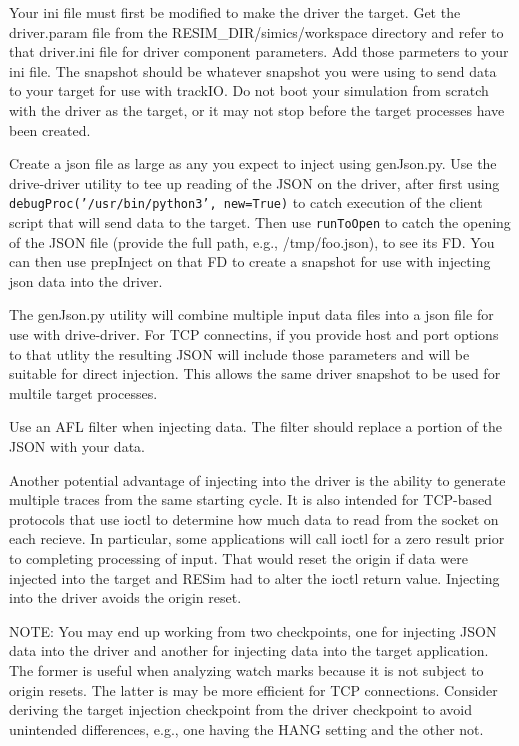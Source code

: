 \documentclass[titlepage]{article}
\begin{document}
Your ini file must first be modified to make the driver the target.  Get the driver.param file from the RESIM\_DIR/simics/workspace directory and
refer to that driver.ini file for driver component parameters.  Add those parmeters to your ini file.   The snapshot should be whatever snapshot you were using to send
data to your target for use with trackIO.
Do not boot your simulation from scratch with the driver as the target, or it may not stop before the target processes have been created.

Create a json file as large as any you expect to inject using genJson.py.
Use the drive-driver utility to tee up reading of the JSON on the driver, after first using {\tt debugProc('/usr/bin/python3', new=True)}
to catch execution of the client script that will send data to the target.  
Then use {\tt runToOpen} to catch the opening of the JSON file (provide the full path, e.g., /tmp/foo.json), to see its FD.  You can then use prepInject on that FD
to create a snapshot for use with injecting json data into the driver.  

The genJson.py utility will combine multiple input data files into a json file for use with drive-driver.  For TCP connectins, if 
you provide host and port options to that utlity the resulting JSON will include those parameters and will be suitable for direct injection.
This allows the same driver snapshot to be used for multile target processes.

Use an AFL filter when injecting data.  The filter should replace a portion of the JSON with your data.

Another potential advantage of injecting into the driver is the ability to generate multiple traces from the same starting cycle.  
It is also intended for TCP-based protocols that use ioctl to determine how much data to
read from the socket on each recieve.  In particular, some applications will call ioctl for a zero result prior to completing processing of input.  
That would reset the origin if data were injected into the target and RESim had to alter the ioctl return value.  Injecting into the driver avoids the
origin reset.  

NOTE:  You may end up working from two checkpoints, one for injecting JSON data into the driver and another for injecting data into the target application.
The former is useful when analyzing watch marks because it is not subject to origin resets.  The latter is may be more efficient for TCP connections.
Consider deriving the target injection checkpoint from the driver checkpoint to avoid unintended differences, e.g., one having the HANG setting and the other not.
\end{document}
